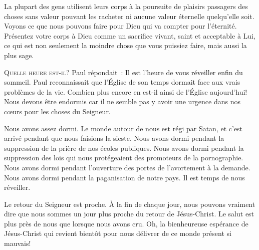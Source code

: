 La plupart des gens utilisent leurs corps à la poursuite de plaisirs passagers
 \ocadr des choses sans valeur pouvant les racheter ni aucune valeur éternelle
 quelqu'elle soit. Voyons ce que nous pouvons faire pour Dieu qui va compter
 pour l'éternité. Présentez votre corps à Dieu comme un sacrifice vivant,
 saint et acceptable à Lui, ce qui est non seulement la moindre chose
 que vous puissiez faire, mais aussi la plus sage.

\dvrule






\lettrine{Q}{uelle heure est-il?}
 Paul répondait~: 
 \og Il est l'heure de vous réveiller enfin du sommeil. \fg{}
 Paul reconnaissait que l'Église  de son temps
 dormait face aux vrais problèmes de la vie.
 Combien plus encore en est-il ainsi de l'Église  aujourd'hui!
 Nous devons être endormis car il ne semble pas y avoir une urgence
 dans nos c\oe{}urs pour les choses du Seigneur.

Nous avons assez dormi. Le monde autour de nous est régi par Satan,
 et c'est arrivé pendant que nous faisions la sieste.
 Nous avons dormi pendant la suppression de la prière
 de nos écoles publiques. Nous avons dormi pendant la suppression
 des lois qui nous protégeaient des promoteurs de la pornographie.
 Nous avons dormi pendant l'ouverture des portes de l'avortement à la demande.
 Nous avons dormi pendant la paganisation de notre pays.
 Il est temps de nous réveiller.


Le retour du Seigneur est proche.
 À la fin de chaque jour, nous pouvons vraiment dire que nous sommes
 un jour plus proche du retour de Jésus-Christ.
 Le salut est plus près de nous que lorsque nous avons cru.
 Oh, la bienheureuse espérance de Jésus-Christ qui revient bientôt
 pour nous délivrer de ce monde présent si mauvais!

